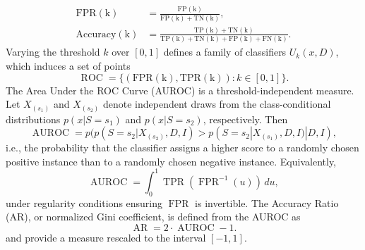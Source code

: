 \begin{example}
\begin{align}
		\operatorname{FPR(k)} &= \frac{\operatorname{FP(k)}}{\operatorname{FP(k)} + \operatorname{TN(k)}},\\
		\operatorname{Accuracy(k)} &= \frac{\operatorname{TP(k)} + \operatorname{TN(k)}}{\operatorname{TP(k)} + \operatorname{TN(k)} + \operatorname{FP(k)} + \operatorname{FN(k)}}.
	\end{align}
	Varying the threshold $k$ over $[0,1]$ defines a family of classifiers $U_k(x,D)$, which induces a set of points
	\begin{equation}
		\operatorname{ROC} = \{ (\operatorname{FPR(k)}, \operatorname{TPR(k)}) : k \in [0,1] \}.
	\end{equation}
	The Area Under the ROC Curve (AUROC) is a threshold-independent measure. Let $X_{(s_1)}$ and $X_{(s_2)}$ denote independent draws from the class-conditional distributions $p(x | S = s_1)$ and $p(x | S = s_2)$, respectively. Then
	\begin{equation}
		\operatorname{AUROC} = p( p(S=s_2 | X_{(s_2)}, D, I) > p(S=s_2 | X_{(s_1)}, D, I)| D, I ),
	\end{equation}
	i.e., the probability that the classifier assigns a higher score to a randomly chosen positive instance than to a randomly chosen negative instance. Equivalently,
	\begin{equation}
		\operatorname{AUROC} = \int_0^1 \operatorname{TPR}(\operatorname{FPR}^{-1}(u)) \, du,
	\end{equation}
	under regularity conditions ensuring $\operatorname{FPR}$ is invertible. The Accuracy Ratio (AR), or normalized Gini coefficient, is defined from the AUROC as
	\begin{equation}
		\operatorname{AR} = 2 \cdot \operatorname{AUROC} - 1.
	\end{equation}
	and provide a measure rescaled to the interval $[-1,1]$.
	
\end{example}


